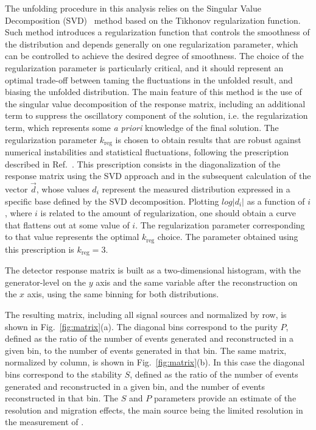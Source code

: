 The unfolding procedure in this analysis relies on the Singular Value Decomposition (SVD)~\cite{Hocker:1995kb} method based on the Tikhonov regularization function. Such method introduces a regularization function that controls the smoothness of the distribution and depends generally on one regularization parameter, which can be controlled to achieve the desired degree of smoothness.
The choice of the regularization parameter is particularly critical, and it should represent an optimal trade-off between taming the fluctuations in the unfolded result, and biasing the unfolded distribution.
The main feature of this method is the use of the singular value decomposition of the response matrix, including an additional term to suppress the oscillatory component of the solution, i.e. the regularization term, which represents some \textit{a priori} knowledge of the final solution.
The regularization parameter $k_\mathrm{reg}$ is chosen to obtain results that are robust against numerical instabilities and statistical fluctuations, following the prescription described in Ref.~\cite{Hocker:1995kb}. This prescription consists in the diagonalization of the response matrix using the SVD approach and in the subsequent calculation of the vector $\vec{d}$, whose values $d_i$ represent the measured distribution expressed in a specific base defined by the SVD decomposition. Plotting $log|d_i|$ as a function of $i$, where $i$ is related to the amount of regularization, one should obtain a curve that flattens out at some value of $i$. The regularization parameter corresponding to that value represents the optimal $k_\mathrm{reg}$ choice. The parameter obtained using this prescription is $k_\mathrm{reg} = 3$.

The detector response matrix is built as a two-dimensional histogram, with the generator-level \pth{} on the $y$ axis and the same variable after the reconstruction on the $x$ axis, using the same binning for both distributions.

The resulting matrix, including all signal sources and normalized by row, is shown in Fig.~\ref{fig:matrix}(a).
The diagonal bins correspond to the purity $P$, defined as the ratio of the number of events generated and reconstructed in a given bin, to the
number of events generated in that bin. The same matrix, normalized by column, is shown in Fig.~\ref{fig:matrix}(b). In this case the diagonal bins correspond to the stability $S$, defined as the ratio of the number of events generated and reconstructed in a given bin, and the number of events reconstructed in that bin. The $S$ and $P$ parameters provide an estimate of the \pth resolution and migration effects, the main source being the limited resolution in the measurement of \MET.

